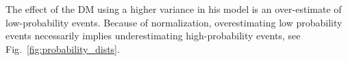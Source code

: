 \documentclass[11pt]{article}
\newcommand{\fref}[1]{Fig.~\ref{fig:#1}}
\newcommand{\ND}{\mathcal{N}} %
\numberwithin{equation}{section}
\begin{document}
%
%
%
%
%
%

The effect of the DM using a higher variance in his model is an over-estimate of low-probability events. Because of normalization, overestimating low probability events necessarily implies underestimating high-probability events, see \fref{probability_dists}.
\end{document}
